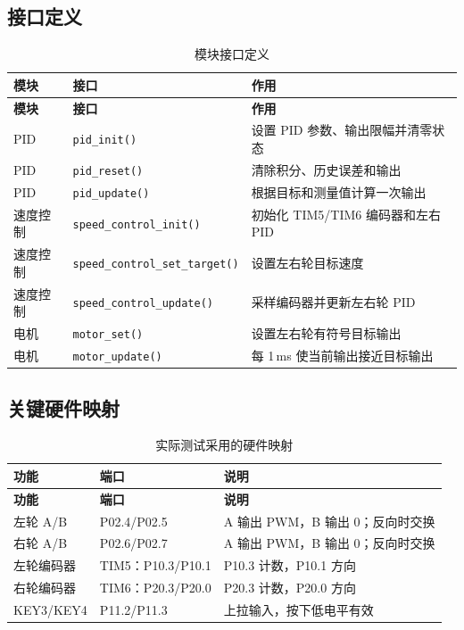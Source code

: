\documentclass[11pt,a4paper,fontset=fandol]{ctexart}
\begin{document}
\subsection{接口定义}

\small
\begin{longtable}{p{}p{}p{}}
\caption{模块接口定义}\\
\toprule
\textbf{模块} & \textbf{接口} & \textbf{作用}\\
\midrule
\endfirsthead
\toprule
\textbf{模块} & \textbf{接口} & \textbf{作用}\\
\midrule
\endhead
PID & \texttt{pid\_init()} & 设置 PID 参数、输出限幅并清零状态\\
PID & \texttt{pid\_reset()} & 清除积分、历史误差和输出\\
PID & \texttt{pid\_update()} & 根据目标和测量值计算一次输出\\
速度控制 & \texttt{speed\_control\_init()} & 初始化 TIM5/TIM6 编码器和左右 PID\\
速度控制 & \texttt{speed\_control\_set\_target()} & 设置左右轮目标速度\\
速度控制 & \texttt{speed\_control\_update()} & 采样编码器并更新左右轮 PID\\
电机 & \texttt{motor\_set()} & 设置左右轮有符号目标输出\\
电机 & \texttt{motor\_update()} & 每 1\,ms 使当前输出接近目标输出\\
\bottomrule
\end{longtable}
\normalsize

\subsection{关键硬件映射}

\begin{longtable}{p{}p{}p{}}
\caption{实际测试采用的硬件映射}\\
\toprule
\textbf{功能} & \textbf{端口} & \textbf{说明}\\
\midrule
\endfirsthead
\toprule
\textbf{功能} & \textbf{端口} & \textbf{说明}\\
\midrule
\endhead
左轮 A/B & P02.4/P02.5 & A 输出 PWM，B 输出 0；反向时交换\\
右轮 A/B & P02.6/P02.7 & A 输出 PWM，B 输出 0；反向时交换\\
左轮编码器 & TIM5：P10.3/P10.1 & P10.3 计数，P10.1 方向\\
右轮编码器 & TIM6：P20.3/P20.0 & P20.3 计数，P20.0 方向\\
KEY3/KEY4 & P11.2/P11.3 & 上拉输入，按下低电平有效\\
\bottomrule
\end{longtable}
\end{document}
